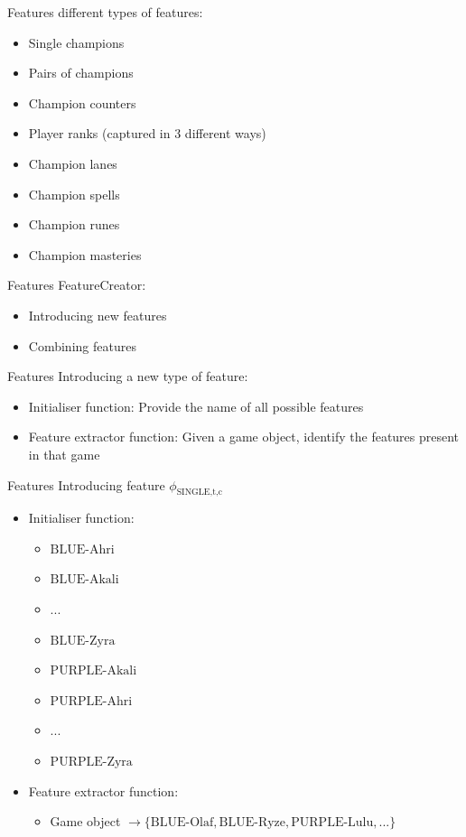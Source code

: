 \begin{frame}{Features}
 different types of features:\\
\begin{itemize}
\item Single champions
\item Pairs of champions
\item Champion counters
\item Player ranks (captured in 3 different ways)
\item Champion lanes
\item Champion spells
\item Champion runes
\item Champion masteries
\end{itemize}
\end{frame}


\begin{frame}{Features}
\centering
FeatureCreator:
\begin{itemize}
\item Introducing new features
\item Combining features
\end{itemize}
\end{frame}

\begin{frame}{Features}
Introducing a new type of feature:
\begin{itemize}
\item Initialiser function: Provide the name of all possible features
\item Feature extractor function: Given a game object, identify the features present in that game
\end{itemize}
\end{frame}

\begin{frame}{Features}
Introducing feature $\phi_\text{SINGLE,t,c}$
\begin{itemize}
\item Initialiser function: 
	\begin{itemize}
	\item $\text{BLUE-Ahri}$
	\item $\text{BLUE-Akali}$
	\item ...
	\item $\text{BLUE-Zyra}$
	\item $\text{PURPLE-Akali}$
	\item $\text{PURPLE-Ahri}$
	\item ...
	\item $\text{PURPLE-Zyra}$
	\end{itemize}
\item Feature extractor function:  
	\begin{itemize}
	\item Game object $\rightarrow \{\text{BLUE-Olaf}, \text{BLUE-Ryze}, \text{PURPLE-Lulu}, ...\}$
	\end{itemize}
\end{itemize}
\end{frame}

